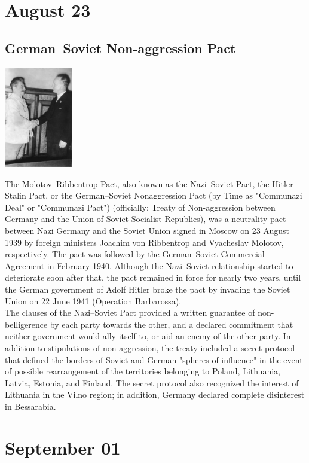 \documentclass[11pt]{report}
\begin{document}
\section{August 23}
\subsection{German–Soviet Non-aggression Pact}
\vspace{2mm}\begin{center}\includegraphics[width=3cm]{./img/gerSovietNonAggPact.jpg}\end{center}
The Molotov–Ribbentrop Pact, also known as the Nazi–Soviet Pact, the Hitler–Stalin Pact, or the German–Soviet Nonaggression Pact (by Time as "Communazi Deal" or "Communazi Pact") (officially: Treaty of Non-aggression between Germany and the Union of Soviet Socialist Republics), was a neutrality pact between Nazi Germany and the Soviet Union signed in Moscow on 23 August 1939 by foreign ministers Joachim von Ribbentrop and Vyacheslav Molotov, respectively. The pact was followed by the German–Soviet Commercial Agreement in February 1940. Although the Nazi–Soviet relationship started to deteriorate soon after that, the pact remained in force for nearly two years, until the German government of Adolf Hitler broke the pact by invading the Soviet Union on 22 June 1941 (Operation Barbarossa).\\ \indent The clauses of the Nazi–Soviet Pact provided a written guarantee of non-belligerence by each party towards the other, and a declared commitment that neither government would ally itself to, or aid an enemy of the other party. In addition to stipulations of non-aggression, the treaty included a secret protocol that defined the borders of Soviet and German "spheres of influence" in the event of possible rearrangement of the territories belonging to Poland, Lithuania, Latvia, Estonia, and Finland. The secret protocol also recognized the interest of Lithuania in the Vilno region; in addition, Germany declared complete disinterest in Bessarabia.
\section{September 01}
\end{document}
